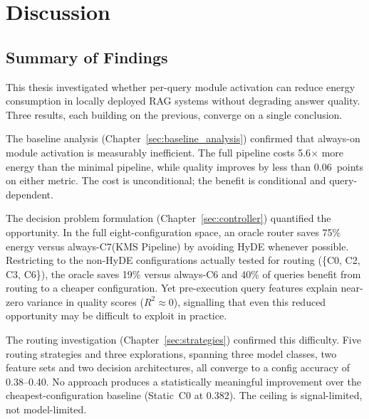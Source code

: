\newpage
\section{Discussion}
\label{sec:discussion}



\subsection{Summary of Findings}
\label{subsec:synthesis}

This thesis investigated whether per-query module activation can reduce
energy consumption in locally deployed RAG systems without degrading answer
quality.  Three results, each building on the previous, converge on a
single conclusion.

The baseline analysis (Chapter~\ref{sec:baseline_analysis}) confirmed that
always-on module activation is measurably inefficient.  The full pipeline
costs 5.6$\times$ more energy than the minimal pipeline, while
quality improves by less than 0.06~points on either metric.  The cost is unconditional;
the benefit is conditional and query-dependent.

The decision problem formulation (Chapter~\ref{sec:controller}) quantified
the opportunity.  In the full eight-configuration space, an oracle router
saves 75\% energy versus always-C7(KMS Pipeline) by avoiding HyDE whenever possible.
Restricting to the non-HyDE configurations actually tested for routing
(\{C0, C2, C3, C6\}), the oracle saves 19\% versus always-C6 and 40\%
of queries benefit from routing to a cheaper configuration.  Yet
pre-execution query features explain near-zero variance in quality scores
($R^2 \approx 0$), signalling that even this reduced opportunity may be
difficult to exploit in practice.

The routing investigation (Chapter~\ref{sec:strategies}) confirmed this
difficulty.  Five routing strategies and three explorations, spanning
three model classes, two feature sets and two decision
architectures, all converge to a config accuracy of
0.38--0.40.  No approach produces a statistically meaningful improvement
over the cheapest-configuration baseline (Static~C0 at 0.382).  The
ceiling is signal-limited, not model-limited.


